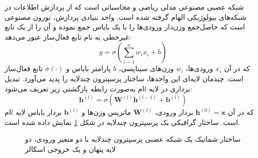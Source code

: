 شبکه عصبی مصنوعی مدلی ریاضی و محاسباتی است که از پردازش اطلاعات در شبکه‌های بیولوژیکی الهام گرفته شده است. واحد بنیادی پردازش، نورون مصنوعی است که حاصل‌جمع وزن‌دار ورودی‌ها را با یک بایاس جمع نموده و آن را از یک تابع غیرخطی به نام تابع فعال‌ساز عبور می‌دهد:
\begin{equation}
y = \sigma\left(\sum_{i=1}^{n} w_i x_i + b\right)
\label{eq:neuron}
\end{equation}
که در آن $x_i$ ورودی‌ها، $w_i$ وزن‌های سیناپسی، $b$ پارامتر بایاس و $\sigma(\cdot)$ تابع فعال‌ساز است. چیدمان لایه‌ای این واحدها، ساختار پرسپترون چندلایه را پدید می‌آورد. تبدیل برداری در لایه $l$ام به‌صورت رابطه بازگشتی زیر تعریف می‌شود:
\begin{equation}
\mathbf{h}^{(l)} = \sigma\left(\mathbf{W}^{(l)} \mathbf{h}^{(l-1)} + \mathbf{b}^{(l)}\right)
\label{eq:mlp}
\end{equation}
که در آن $\mathbf{h}^{(0)} = \mathbf{x}$ بردار ورودی، $\mathbf{W}^{(l)}$ ماتریس وزن‌ها و $\mathbf{b}^{(l)}$ بردار بایاس لایه $l$ام است. ساختار گرافیکی یک پرسپترون چندلایه در شکل \ref{fig:mlp} نمایش داده شده است.

\begin{figure}[t]
\centering
\begin{latin}
\end{latin}
\caption{ساختار شماتیک یک شبکه عصبی پرسپترون چندلایه با دو متغیر ورودی، دو لایه پنهان و یک خروجی اسکالر}
\label{fig:mlp}
\end{figure}

